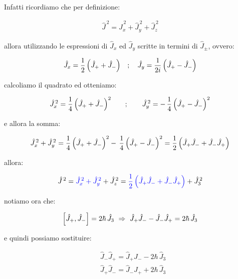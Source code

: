 \begin{myprf}
	Infatti ricordiamo che per definizione:
	
\begin{align*}
	\hat{J}^{\, 2} = \hat{J}_x^{\, 2} + \hat{J}_y^{\, 2} + \hat{J}_z^{\, 2}
\end{align*}
	
	allora utilizzando le espressioni di $\hat{J}_x$ ed $\hat{J}_y$ scritte in termini di $\hat{J}_{\pm}$, ovvero:

\begin{align*}
	\hat{J}_x = \frac{1}{2} \, \qty(\hat{J}_+ + \hat{J}_-) \quad ; \quad \hat{J}_y = \frac{1}{2i} \, \qty(\hat{J}_+ - \hat{J}_-) 
\end{align*}
	
	calcoliamo il quadrato ed otteniamo:
	
\begin{align*}
	\hat{J}_x^{\, 2} = \frac{1}{4} \, \qty(\hat{J}_+ + \hat{J}_-)^2 \qquad ; \qquad  \hat{J}_y^{\, 2} = - \, \frac{1}{4}  \, \qty(\hat{J}_+ - \hat{J}_-)^2
\end{align*}
	
	e allora la somma:
	
\begin{align*}
	\hat{J}_x^{\, 2}  + \hat{J}_y^{\, 2} = \frac{1}{4} \, \qty( \hat{J}_+ + \hat{J}_-)^2 - \, \frac{1}{4}  \, \qty(\hat{J}_+ - \hat{J}_-)^2 = \frac{1}{2} \, \qty(  \hat{J}_+\hat{J}_- + \hat{J}_-\hat{J}_+  )
\end{align*}
	
	allora:
	
\begin{align*}
	\hat{J}^{\, 2} = \textcolor{blue}{\hat{J}_x^{\, 2} + \hat{J}_y^{\, 2}} + \hat{J}_z^{\, 2} = \textcolor{blue}{ \frac{1}{2} \, \qty(  \hat{J}_+\hat{J}_- + \hat{J}_-\hat{J}_+  ) } + \hat{J}_3^{\, 2}
\end{align*}

	notiamo ora che:

\begin{align*}
	\qty[\hat{J}_+, \hat{J}_-] = 2\hbar \, \hat{J}_3 \, \, \Rightarrow \,\, \hat{J}_+ \hat{J}_- - \hat{J}_- \hat{J}_+ = 2\hbar\, \hat{J}_3
\end{align*}

	e quindi possiamo sostituire:
	
\begin{align*}
	& \hat{J}_-\hat{J}_+ =\hat{J}_+\hat{J}_- - 2\hbar \, \hat{J}_3 \\
	& \hat{J}_+\hat{J}_- =\hat{J}_-\hat{J}_+ + 2\hbar \, \hat{J}_3
\end{align*}


\end{myprf}
